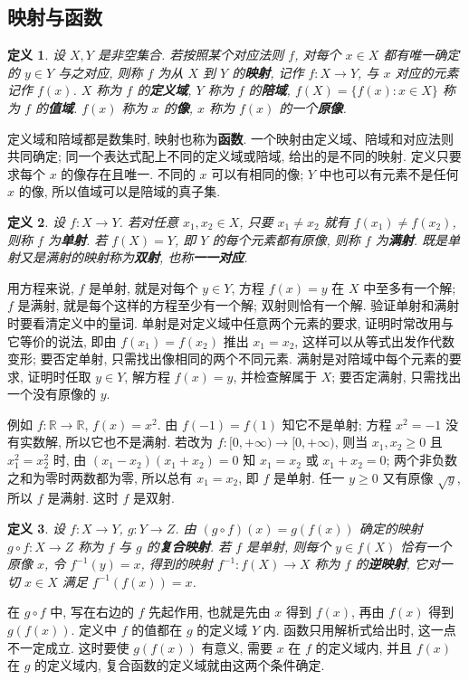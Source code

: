 \documentclass[UTF8,openany]{ctexbook}
\theoremstyle{chinesetextbook}
\newtheorem{definition}{定义}[section]
\begin{document}
\subsection{映射与函数}
\begin{definition}
设 $X,Y$ 是非空集合. 若按照某个对应法则 $f$, 对每个 $x\in X$ 都有唯一确定的 $y\in Y$ 与之对应, 则称 $f$ 为从 $X$ 到 $Y$ 的\textbf{映射}, 记作 $f:X\to Y$, 与 $x$ 对应的元素记作 $f(x)$. $X$ 称为 $f$ 的\textbf{定义域}, $Y$ 称为 $f$ 的\textbf{陪域}, $f(X)=\{f(x):x\in X\}$ 称为 $f$ 的\textbf{值域}. $f(x)$ 称为 $x$ 的\textbf{像}, $x$ 称为 $f(x)$ 的一个\textbf{原像}.
\end{definition}
定义域和陪域都是数集时, 映射也称为\textbf{函数}. 一个映射由定义域、陪域和对应法则共同确定; 同一个表达式配上不同的定义域或陪域, 给出的是不同的映射. 定义只要求每个 $x$ 的像存在且唯一. 不同的 $x$ 可以有相同的像; $Y$ 中也可以有元素不是任何 $x$ 的像, 所以值域可以是陪域的真子集.
\begin{definition}
设 $f:X\to Y$. 若对任意 $x_1,x_2\in X$, 只要 $x_1\ne x_2$ 就有 $f(x_1)\ne f(x_2)$, 则称 $f$ 为\textbf{单射}. 若 $f(X)=Y$, 即 $Y$ 的每个元素都有原像, 则称 $f$ 为\textbf{满射}. 既是单射又是满射的映射称为\textbf{双射}, 也称\textbf{一一对应}.
\end{definition}
用方程来说, $f$ 是单射, 就是对每个 $y\in Y$, 方程 $f(x)=y$ 在 $X$ 中至多有一个解; $f$ 是满射, 就是每个这样的方程至少有一个解; 双射则恰有一个解. 验证单射和满射时要看清定义中的量词. 单射是对定义域中任意两个元素的要求, 证明时常改用与它等价的说法, 即由 $f(x_1)=f(x_2)$ 推出 $x_1=x_2$, 这样可以从等式出发作代数变形; 要否定单射, 只需找出像相同的两个不同元素. 满射是对陪域中每个元素的要求, 证明时任取 $y\in Y$, 解方程 $f(x)=y$, 并检查解属于 $X$; 要否定满射, 只需找出一个没有原像的 $y$.

例如 $f:\mathbb R\to\mathbb R$, $f(x)=x^2$. 由 $f(-1)=f(1)$ 知它不是单射; 方程 $x^2=-1$ 没有实数解, 所以它也不是满射. 若改为 $f:[0,+\infty)\to[0,+\infty)$, 则当 $x_1,x_2\ge0$ 且 $x_1^2=x_2^2$ 时, 由 $(x_1-x_2)(x_1+x_2)=0$ 知 $x_1=x_2$ 或 $x_1+x_2=0$; 两个非负数之和为零时两数都为零, 所以总有 $x_1=x_2$, 即 $f$ 是单射. 任一 $y\ge0$ 又有原像 $\sqrt y$, 所以 $f$ 是满射. 这时 $f$ 是双射.
\begin{definition}
设 $f:X\to Y$, $g:Y\to Z$. 由 $(g\circ f)(x)=g(f(x))$ 确定的映射 $g\circ f:X\to Z$ 称为 $f$ 与 $g$ 的\textbf{复合映射}. 若 $f$ 是单射, 则每个 $y\in f(X)$ 恰有一个原像 $x$, 令 $f^{-1}(y)=x$, 得到的映射 $f^{-1}:f(X)\to X$ 称为 $f$ 的\textbf{逆映射}, 它对一切 $x\in X$ 满足 $f^{-1}(f(x))=x$.
\end{definition}
在 $g\circ f$ 中, 写在右边的 $f$ 先起作用, 也就是先由 $x$ 得到 $f(x)$, 再由 $f(x)$ 得到 $g(f(x))$. 定义中 $f$ 的值都在 $g$ 的定义域 $Y$ 内. 函数只用解析式给出时, 这一点不一定成立. 这时要使 $g(f(x))$ 有意义, 需要 $x$ 在 $f$ 的定义域内, 并且 $f(x)$ 在 $g$ 的定义域内, 复合函数的定义域就由这两个条件确定.
\end{document}
